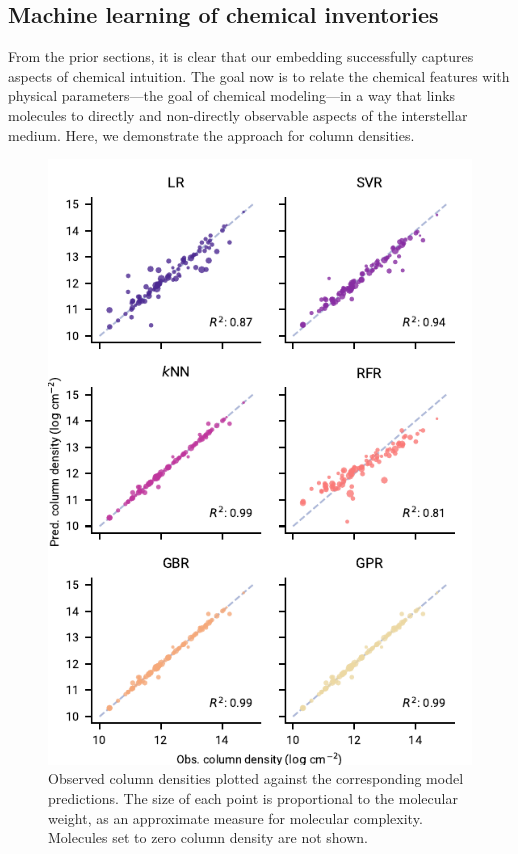 \documentclass[twocolumn]{aastex63}
\begin{document}
\subsection{Machine learning of chemical inventories}

From the prior sections, it is clear that our embedding successfully captures aspects of chemical intuition. The goal now is to relate the chemical features with physical parameters---the goal of chemical modeling---in a way that links molecules to directly and non-directly observable aspects of the interstellar medium. Here, we demonstrate the approach for column densities.

\begin{figure}
    \centering
    \includegraphics[width=\columnwidth]{r2_plot.pdf}
    \caption{Observed column densities plotted against the corresponding model predictions. The size of each point is proportional to the molecular weight, as an approximate measure for molecular complexity. Molecules set to zero column density are not shown.}
    \label{fig:r2plot}
\end{figure}
\end{document}
